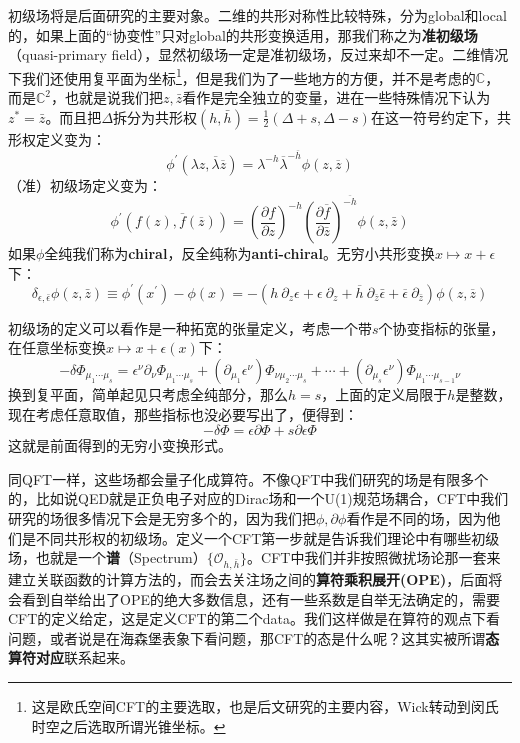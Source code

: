 初级场将是后面研究的主要对象。二维的共形对称性比较特殊，分为global和local的，如果上面的“协变性”只对global的共形变换适用，那我们称之为\textbf{准初级场}（quasi-primary field），显然初级场一定是准初级场，反过来却不一定。二维情况下我们还使用复平面为坐标\footnote{这是欧氏空间CFT的主要选取，也是后文研究的主要内容，Wick转动到闵氏时空之后选取所谓光锥坐标。}，但是我们为了一些地方的方便，并不是考虑的$\mathbb{C}$，而是$\mathbb{C}^2$，也就是说我们把$z,\bar z$看作是完全独立的变量，进在一些特殊情况下认为$z^*=\bar z$。而且把$\Delta$拆分为共形权$(h,\bar h)=\frac{1}{2}\left(\Delta+s,\Delta-s\right)$在这一符号约定下，共形权定义变为：
\begin{equation}
	\boxed{
	\phi^{\prime}(\lambda z,\overline{\lambda}\overline{z})=\lambda^{-h}\overline{\lambda}^{-\overline{h}}\phi(z,\overline{z})
	}
\end{equation}
（准）初级场定义变为：
\begin{equation}
	\boxed{
		\phi^{\prime}\left(f(z),\overline{f}(\overline{z})\right)=\left(\frac{\partial f}{\partial z}\right)^{-h}\left(\frac{\partial\overline{f}}{\partial\bar{z}}\right)^{\overline{-h}}\phi(z,\bar{z})
	}
\end{equation}
如果$\phi$全纯我们称为\textbf{chiral}，反全纯称为\textbf{anti-chiral}。无穷小共形变换$x\mapsto x+\epsilon$下：
\begin{equation}\label{ict}
	\boxed{
	\delta_{\epsilon,\bar{\epsilon}}\phi(z,\bar{z})\equiv\phi^\prime(x^\prime)-\phi(x)=-\left(h\mathrm{~}\partial_z\epsilon+\epsilon\mathrm{~}\partial_z+\overline{h}\mathrm{~}\partial_{\bar{z}}\bar{\epsilon}+\overline{\epsilon}\mathrm{~}\partial_{\bar{z}}\right)\phi(z,\overline{z})
	}
\end{equation}
\begin{remark}
	初级场的定义可以看作是一种拓宽的张量定义，考虑一个带$s$个协变指标的张量，在任意坐标变换$x\mapsto x+\epsilon(x)$下：
	\[-\delta\Phi_{\mu_1\cdots\mu_s}=\epsilon^\nu\partial_\nu\Phi_{\mu_1\cdots\mu_s}+(\partial_{\mu_1}\epsilon^\nu)\Phi_{\nu\mu_2\cdots\mu_s}+\cdots+(\partial_{\mu_s}\epsilon^\nu)\Phi_{\mu_1\cdots\mu_{s-1}\nu}\]
	换到复平面，简单起见只考虑全纯部分，那么$h=s$，上面的定义局限于$h$是整数，现在考虑任意取值，那些指标也没必要写出了，便得到：
	\[-\delta\Phi=\epsilon\partial\Phi+s\partial \epsilon\Phi\]
	这就是前面得到的无穷小变换形式。
\end{remark}

同QFT一样，这些场都会量子化成算符。不像QFT中我们研究的场是有限多个的，比如说QED就是正负电子对应的Dirac场和一个U(1)规范场耦合，CFT中我们研究的场很多情况下会是无穷多个的，因为我们把$\phi,\partial\phi$看作是不同的场，因为他们是不同共形权的初级场。定义一个CFT第一步就是告诉我们理论中有哪些初级场，也就是一个\textbf{谱}（Spectrum）$\{\mathcal{O}_{h,\bar h}\}$。CFT中我们并非按照微扰场论那一套来建立关联函数的计算方法的，而会去关注场之间的\textbf{算符乘积展开(OPE)}，后面将会看到自举给出了OPE的绝大多数信息，还有一些系数是自举无法确定的，需要CFT的定义给定，这是定义CFT的第二个data。我们这样做是在算符的观点下看问题，或者说是在海森堡表象下看问题，那CFT的态是什么呢？这其实被所谓\textbf{态算符对应}联系起来。

